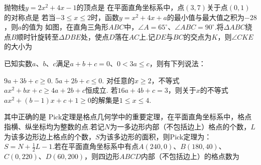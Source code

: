 \documentclass[10pt]{article}
\begin{document}
\begin{questions}{\complitingintroduction}
    \question 抛物线$y=2x^2+4x-1$的顶点是\complitingline
    \question 在平面直角坐标系中，点$(3,7)$关于点$(0,1)$的对称点是\complitingline
    \question 若当$-3 \leq x \leq 2$时，函数$y=x^2+4x+a$的最小值与最大值之积为$-28$，则$a$的值为\complitingline
    \question 如图，在直角三角形$ABC$中，$\angle A=65^{\circ}$、$\angle ABC=90^{\circ}$.将$\Delta ABC$绕点$B$顺时针旋转至$\Delta DBE$处，使点$D$落在$AC$上.记$DE$与$BC$的交点为$K$，则$\angle CKE$的大小为\complitingline
    \begin{figure}[!htb]
        \raggedleft
    \end{figure}
    \question 已知实数$a$、$b$、$c$满足$a+b+c=0$、$0 < 3a \leq c$，则有下列说法：
    \begin{subsubquestions}
        \subsubquestion $9a+3b+c \geq 0$.
        \subsubquestion $5a+2b+c \leq 0$.
        \subsubquestion 对任意的$x \geq 2$，不等式$ax^2+bx+c \geq 4a+2b+c$恒成立.
        \subsubquestion 若$16a+4b+c=3$，则关于$x$的不等式$ax^2+(b-1)x+c+1 \geq 0$的解集是$1 \leq x \leq 4$.
    \end{subsubquestions}
    其中正确的是\complitingline
    \question Pick定理是格点几何学中的重要定理，在平面直角坐标系中，格点指横、纵坐标均为整数的点.若记$N$为一多边形内部（不包括边上）格点的个数，$L$为该多边形边上格点的个数，$S$为该多边形的面积，则Pick定理为：$S=N+\frac{1}{2}L-1$.若在平面直角坐标系中有点$A(240,0)$、$B(180,40)$、$C(0,220)$、$D(60,200)$，则四边形$ABCD$内部（不包括边上）的格点数为\complitingline
\end{questions}
\end{document}
